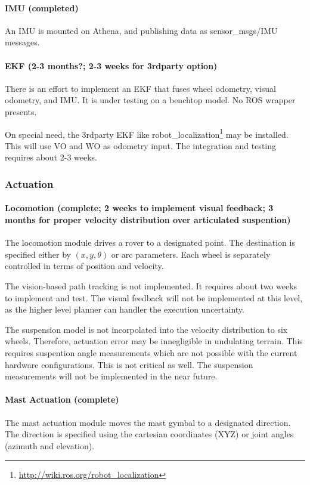 \documentclass[conference]{IEEEtran}
\newcommand{\kyon}[1]{{\color{cyan} #1}}
\newcommand{\done}[1]{{\color{gray} #1}}
\begin{document}
\paragraph{IMU (completed)}
\done{
An IMU is mounted on Athena, and publishing data as sensor\_msgs/IMU messages.
}

\paragraph{EKF (2-3 months?; 2-3 weeks for 3rdparty option)}
There is an effort to implement an EKF that fuses wheel odometry, visual odometry, and IMU. It is under testing on a benchtop model. No ROS wrapper presents.

On special need,  the 3rdparty EKF like robot\_localization\footnote{\url{http://wiki.ros.org/robot_localization}} may be installed. This will use VO and WO as odometry input. The integration and testing requires about 2-3 weeks.


\subsubsection{Actuation}

\paragraph{Locomotion (complete; 2 weeks to implement visual feedback; 3 months for proper velocity distribution over articulated suspention)}
\done{
The locomotion module drives a rover to a designated point. The destination is specified either by $ (x, y, \theta) $ or arc parameters. Each wheel is separately controlled in terms of position and velocity.

The vision-based path tracking is not implemented. It requires about two weeks to implement and test. 
\kyon{The visual feedback will not be implemented at this level, as the higher level planner can handler the execution uncertainty.}

The suspension model is not incorpolated into the velocity distribution to six wheels. Therefore, actuation error may be innegligible in undulating terrain. This requires suspention angle measurements which are not possible with the current hardware configurations. 
\kyon{This is not critical as well. The suspension measurements will not be implemented in the near future.}
}


\paragraph{Mast Actuation (complete)}
\done{
The mast actuation module moves the mast gymbal to a designated direction. The direction is specified using the cartesian coordinates (XYZ) or joint angles (azimuth and elevation). 
}
\end{document}
